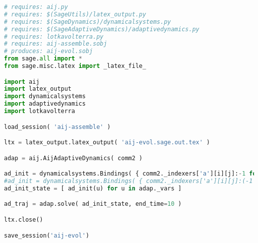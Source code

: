 \begin{lstlisting}[language=Python]
# requires: aij.py
# requires: $(SageUtils)/latex_output.py
# requires: $(SageDynamics)/dynamicalsystems.py
# requires: $(SageAdaptiveDynamics)/adaptivedynamics.py
# requires: lotkavolterra.py
# requires: aij-assemble.sobj
# produces: aij-evol.sobj
from sage.all import *
from sage.misc.latex import _latex_file_

import aij
import latex_output
import dynamicalsystems
import adaptivedynamics
import lotkavolterra

load_session( 'aij-assemble' )

ltx = latex_output.latex_output( 'aij-evol.sage.out.tex' )

adap = aij.AijAdaptiveDynamics( comm2 )

ad_init = dynamicalsystems.Bindings( { comm2._indexers['a'][i][j]:-1 for i in comm2._population_indices for j in comm2._population_indices } ) + dynamicalsystems.Bindings( { comm2._indexers['r'][i]:1 for i in comm2._population_indices } )
#ad_init = dynamicalsystems.Bindings( { comm2._indexers['a'][i][j]:(-1 if i == j else -0.75 if i < j else -0.7) for i in comm2._population_indices for j in comm2._population_indices } ) + dynamicalsystems.Bindings( { comm2._indexers['r'][i]:1 for i in comm2._population_indices } )
ad_init_state = [ ad_init(u) for u in adap._vars ]

ad_traj = adap.solve( ad_init_state, end_time=10 )

ltx.close()

save_session('aij-evol')
\end{lstlisting}

